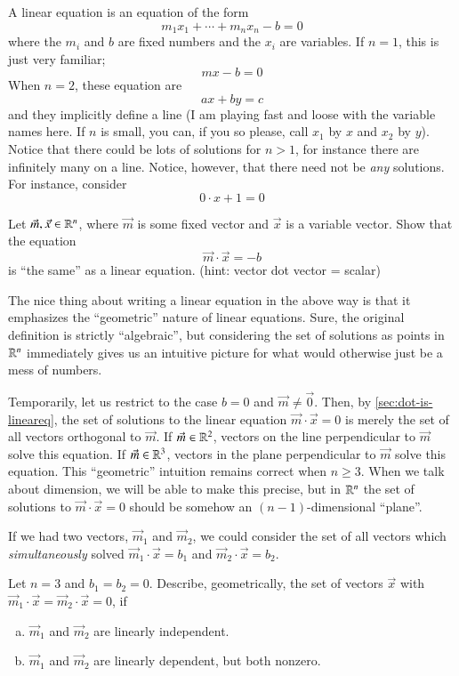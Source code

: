 \documentclass[Main.tex]{subfiles}
\begin{document}
A linear equation is an equation of the form
\[m_1 x_1 + \cdots + m_n x_n - b = 0\]
where the $m_i$ and $b$ are fixed numbers and the $x_i$ are variables.  If $n=1$, this is just very familiar; 
\[mx -b = 0\]
When $n=2$, these equation are 
\[ax+by=c\]
and they implicitly define a line (I am playing fast and loose with the variable names here.  If $n$ is small, you can, if you so please, call $x_1$ by $x$ and $x_2$ by $y$).
Notice that there could be lots of solutions for $n> 1$, for instance there are infinitely many on a line.  
Notice, however, that there need not be \emph{any} solutions.  For instance, consider
\[0\cdot x + 1 = 0\]


\begin{EasyEx}
  \label{sec:dot-is-lineareq}
  Let $\vec{m},\vec{x}\in\mathbb{R}^n$, where $\vec{m}$ is some fixed vector and $\vec{x}$ is a variable vector. 
  Show that the equation
  \[\vec{m}\cdot\vec{x} = -b\]
  is ``the same'' as a linear equation.  (hint: vector dot vector = scalar)
\end{EasyEx}

\begin{Remark}
  The nice thing about writing a linear equation in the above way is that it emphasizes the ``geometric'' nature of linear equations.
  Sure, the original definition is strictly ``algebraic'', but considering the set of solutions as points in $\mathbb{R}^n$ immediately gives us an intuitive picture for what would otherwise just be a mess of numbers.  

  Temporarily, let us restrict to the case $b=0$ and $\vec{m}\ne \vec{0}$.  
  Then, by \ref{sec:dot-is-lineareq}, the set of solutions to the linear equation $\vec{m}\cdot\vec{x}=0$ is merely the set of all vectors orthogonal to $\vec{m}$.  
  If $\vec{m}\in\mathbb{R}^2$, vectors on the line perpendicular to $\vec{m}$ solve this equation.  
  If $\vec{m}\in\mathbb{R}^3$, vectors in the plane perpendicular to $\vec{m}$ solve this equation.
  This ``geometric'' intuition remains correct when $n\ge 3$.  
  When we talk about dimension, we will be able to make this precise, but in $\mathbb{R}^n$ the set of solutions to $\vec{m}\cdot\vec{x}=0$ should be somehow an $(n-1)$-dimensional ``plane''.  
\end{Remark}

If we had two vectors, $\vec{m}_1$ and $\vec{m}_2$, we could consider the set of all vectors which \emph{simultaneously} solved $\vec{m}_1\cdot\vec{x}=b_1$ and $\vec{m}_2\cdot\vec{x}=b_2$.  
\begin{Ex}
  Let $n=3$ and $b_1=b_2=0$.  Describe, geometrically, the set of vectors $\vec{x}$ with $\vec{m}_1\cdot\vec{x}=\vec{m}_2\cdot\vec{x}=0$, if  
  \begin{enumerate}[a)]
  \item $\vec{m}_1$ and $\vec{m}_2$ are linearly independent.
  \item $\vec{m}_1$ and $\vec{m}_2$ are linearly dependent, but both nonzero.  
  \end{enumerate}
\end{Ex}
\end{document}

